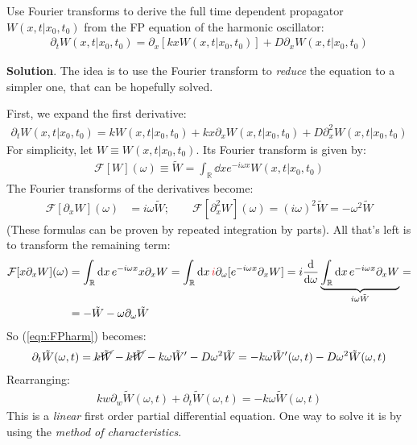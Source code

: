 \documentclass[../template.tex]{subfiles}
\begin{document}
\begin{exo}
    Use Fourier transforms to derive the full time dependent propagator $W(x,t|x_0,t_0)$ from the FP equation of the harmonic oscillator:
    \begin{align} 
        \partial_t W(x,t |x_0,t_0) = \partial_x [kx W(x,t|x_0,t_0)] + D\partial_x W(x,t|x_0,t_0) \label{eqn:FPharm}
    \end{align}
    \medskip
    
    \textbf{Solution}. The idea is to use the Fourier transform to \textit{reduce} the equation to a simpler one, that can be hopefully solved. 

    First, we expand the first derivative:
    \begin{align*}
        \partial_t W(x,t|x_0,t_0) = k W(x,t|x_0,t_0) + kx \partial_x W(x,t|x_0,t_0) + D \partial_x^2 W(x,t|x_0,t_0)
    \end{align*}
    For simplicity, let $W\equiv W(x,t|x_0,t_0)$. Its Fourier transform is given by:
    \begin{align*}
        \mathcal{F}[W](\omega) \equiv \tilde{W} = \int_{\mathbb{R}} \dd{x} e^{-i \omega x} W(x,t|x_0,t_0)
    \end{align*}
    The Fourier transforms of the derivatives become:
    \begin{align*}
        \mathcal{F}[\partial_x W](\omega) &= i \omega \tilde{W}; \qquad \mathcal{F}[\partial_x^2 W](\omega) = (i \omega)^2 \tilde{W} = -\omega^2 \tilde{W}
    \end{align*}
    (These formulas can be proven by repeated integration by parts). All that's left is to transform the remaining term:
    \begin{align*}
        \mathcal{F}[x \partial_x W](\omega) &= \int_{\mathbb{R}} \dd{x} e^{-i \omega x} x \partial_x W = \int_{\mathbb{R}} \dd{x} \textcolor{Red}{i} \partial_\omega [e^{-i \omega x} \partial_x W] = i \dv{\omega} \underbrace{\int_{\mathbb{R}} \dd{x} e^{-i \omega x} \partial_x W}_{i \omega \tilde{W}} =\\
        &= - \tilde{W} - \omega \partial_\omega \tilde{W}
    \end{align*}
    So (\ref{eqn:FPharm}) becomes:
    \begin{align*}
        \partial_t \tilde{W}(\omega, t) = \cancel{k \tilde{W}} -\cancel{ k \tilde{W}} - k \omega \tilde{W}' - D \omega^2 \tilde{W} = -k \omega \tilde{W}'(\omega, t) - D \omega^2 \tilde{W}(\omega, t)
    \end{align*}
    Rearranging:
    \begin{align} \label{eqn:pde-h1}
        k w \partial_w \tilde{W}(\omega, t) + \partial_t \tilde{W}(\omega , t) = - k \omega \tilde{W}(\omega ,t)
    \end{align}
    This is a \textit{linear} first order partial differential equation. One way to solve it is by using the \textit{method of characteristics}.   


\end{exo}
\end{document}
